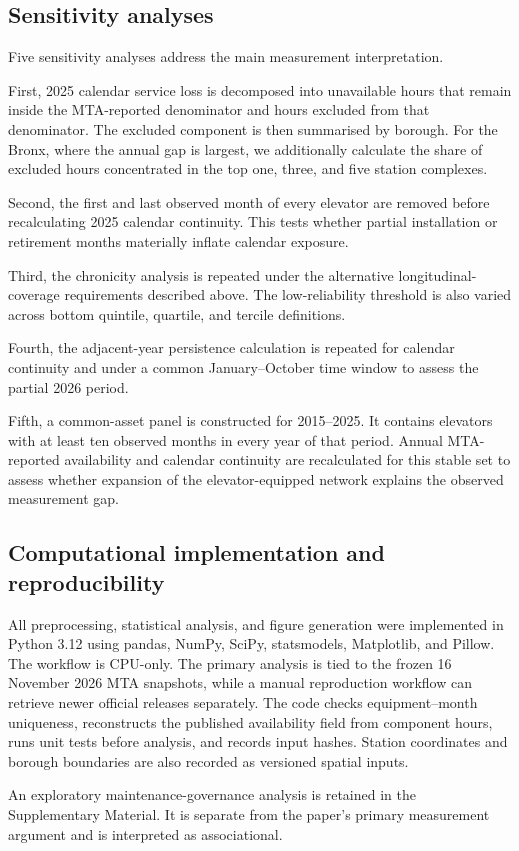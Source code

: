 \subsection{Sensitivity analyses}

Five sensitivity analyses address the main measurement interpretation.

First, 2025 calendar service loss is decomposed into unavailable hours that remain inside the MTA-reported denominator and hours excluded from that denominator. The excluded component is then summarised by borough. For the Bronx, where the annual gap is largest, we additionally calculate the share of excluded hours concentrated in the top one, three, and five station complexes.

Second, the first and last observed month of every elevator are removed before recalculating 2025 calendar continuity. This tests whether partial installation or retirement months materially inflate calendar exposure.

Third, the chronicity analysis is repeated under the alternative longitudinal-coverage requirements described above. The low-reliability threshold is also varied across bottom quintile, quartile, and tercile definitions.

Fourth, the adjacent-year persistence calculation is repeated for calendar continuity and under a common January--October time window to assess the partial 2026 period.

Fifth, a common-asset panel is constructed for 2015--2025. It contains elevators with at least ten observed months in every year of that period. Annual MTA-reported availability and calendar continuity are recalculated for this stable set to assess whether expansion of the elevator-equipped network explains the observed measurement gap.

\subsection{Computational implementation and reproducibility}

All preprocessing, statistical analysis, and figure generation were implemented in Python 3.12 using pandas, NumPy, SciPy, statsmodels, Matplotlib, and Pillow. The workflow is CPU-only. The primary analysis is tied to the frozen 16 November 2026 MTA snapshots, while a manual reproduction workflow can retrieve newer official releases separately. The code checks equipment--month uniqueness, reconstructs the published availability field from component hours, runs unit tests before analysis, and records input hashes. Station coordinates and borough boundaries are also recorded as versioned spatial inputs.

An exploratory maintenance-governance analysis is retained in the Supplementary Material. It is separate from the paper's primary measurement argument and is interpreted as associational.

